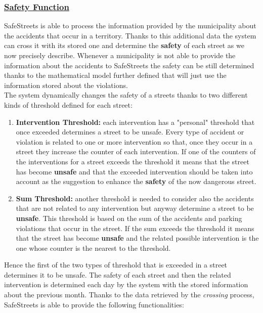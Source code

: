 	\subsubsection[Safety Function]{\hyperlink{toc}{Safety Function}}
		\label{sec:safetyFunction}
		SafeStreets is able to process the information provided by the municipality about the accidents that occur in a territory. Thanks to this additional data the system can cross it with its stored one and determine the \textbf{safety} of each street as we now precisely describe. Whenever a municipality is not able to provide the information about the accidents to SafeStreets the safety can be still determined thanks to the mathematical model further defined that will just use the information stored about the violations. \\
		
		The system dynamically changes the safety of a streets thanks to two different kinds of threshold defined for each street:
		
		\begin{enumerate}
			\item \textbf{Intervention Threshold:} each intervention has a "personal" threshold that once exceeded determines a street to be unsafe. Every type of accident or violation is related to one or more intervention so that, once they occur in a street they increase the counter of each intervention. If one of the counters of the interventions for a street exceeds the threshold it means that the street has become \textbf{unsafe} and that the exceeded intervention should be taken into account as the suggestion to enhance the \textbf{safety} of the now dangerous street.
			
			\item \textbf{Sum Threshold:} another threshold is needed to consider also the accidents that are not related to any intervention but anyway determine a street to be \textbf{unsafe}. This threshold is based on the sum of the accidents and parking violations that occur in the street. If the sum exceeds the threshold it means that the street has become \textbf{unsafe} and the related possible intervention is the one whose counter is the nearest to the threshold.
		\end{enumerate}
	
		Hence the first of the two types of threshold that is exceeded in a street determines it to be unsafe.
		The safety of each street and then the related intervention is determined each day by the system with the stored information about the previous month. Thanks to the data retrieved by the \emph{crossing} process, SafeStreets is able to provide the following functionalities:
		
